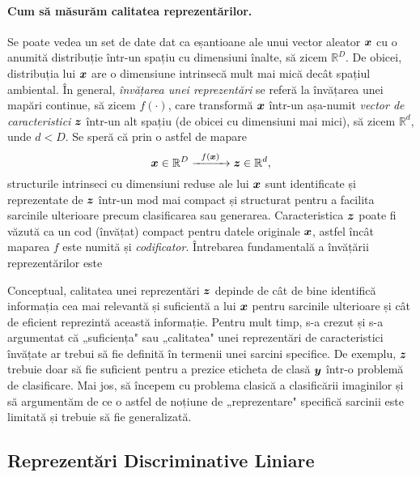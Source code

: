 \documentclass[../../book-main_ro.tex]{subfiles}
\begin{document}
\paragraph{Cum să măsurăm calitatea reprezentărilor.}
Se poate vedea un set de date dat ca eșantioane ale unui vector aleator $\bm{x}$ cu o anumită distribuție într-un spațiu cu dimensiuni înalte, să zicem $\mathbb{R}^D$. De obicei, distribuția lui $\bm{x}$ are o dimensiune intrinsecă mult mai mică decât spațiul ambiental. În general, {\em învățarea unei reprezentări} se referă la învățarea unei mapări continue, să zicem $f(\cdot)$, care transformă $\bm{x}$ într-un așa-numit {\em vector de caracteristici} $\bm{z}$ într-un alt spațiu (de obicei cu dimensiuni mai mici), să zicem $\mathbb{R}^d$, unde $d < D$. Se speră că prin o astfel de mapare
\begin{equation}
	\bm{x} \in \mathbb{R}^D \xrightarrow{\hspace{2mm} f(\bm{x})\hspace{2mm}} \bm{z}  \in \mathbb{R}^d,
	\label{eqn:chap4-1-encoding}
\end{equation}
structurile intrinseci cu dimensiuni reduse ale lui $\bm{x}$ sunt identificate și reprezentate de $\bm{z}$ într-un mod mai compact și structurat pentru a facilita sarcinile ulterioare precum clasificarea sau generarea. Caracteristica $\bm{z}$ poate fi văzută ca un cod (învățat) compact pentru datele originale $\bm{x}$, astfel încât maparea $f$ este numită și \textit{codificator}.
Întrebarea fundamentală a învățării reprezentărilor este
\begin{center}
\end{center}

Conceptual, calitatea unei reprezentări $\bm{z}$ depinde de cât de bine identifică informația cea mai relevantă și suficientă a lui $\bm{x}$ pentru sarcinile ulterioare și cât de eficient reprezintă această informație.
Pentru mult timp, s-a crezut și s-a argumentat că „suficiența" sau „calitatea" unei reprezentări de caracteristici învățate ar trebui să fie definită în termenii unei sarcini specifice. De exemplu, $\bm{z}$ trebuie doar să fie suficient pentru a prezice eticheta de clasă $\bm{y}$ într-o problemă de clasificare. Mai jos, să începem cu problema clasică a clasificării imaginilor și să argumentăm de ce o astfel de noțiune de „reprezentare" specifică sarcinii este limitată și trebuie să fie generalizată.

\subsection{Reprezentări Discriminative Liniare}\label{subsec:LDR}
\end{document}
